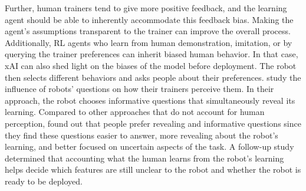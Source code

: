 \documentclass[twoside,11pt]{article}
\begin{document}
\begin{enumerate}
Further, human trainers tend to give more positive feedback, and the learning agent should be able to inherently accommodate this feedback bias. Making the agent's assumptions transparent to the trainer can improve the overall process. Additionally, RL agents who learn from human demonstration, imitation, or by querying the trainer preferences can inherit biased human behavior. In that case, xAI can also shed light on the biases of the model before deployment. The robot then selects different behaviors and asks people about their preferences. \citet{habibian:21} study the influence of robots' questions on how their trainers perceive them. In their approach, the robot chooses informative questions that simultaneously reveal its learning. Compared to other approaches that do not account for human perception, \citet{habibian:21} found out that people prefer revealing and informative questions since they find these questions easier to answer, more revealing about the robot's learning, and better focused on uncertain aspects of the task. A follow-up study determined that accounting what the human learns from the robot's learning helps decide which features are still unclear to the robot and whether the robot is ready to be deployed. 




\end{enumerate}
\end{document}
